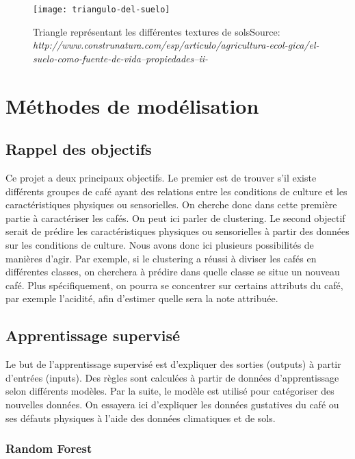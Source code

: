\begin{figure}[H]
	\texttt{[image: triangulo-del-suelo]}
	\caption{\label{TriangleTexture} Triangle représentant les différentes textures de sols\newline Source: \textit{http://www.construnatura.com/esp/articulo/agricultura-ecol-gica/el-suelo-como-fuente-de-vida--propiedades--ii-}}
\end{figure}




\chapter{Méthodes de modélisation}
\section{Rappel des objectifs}\label{obj}
Ce projet a deux principaux objectifs. Le premier est de trouver s'il existe différents groupes de café ayant des relations entre les conditions de culture et les caractéristiques physiques ou sensorielles. On cherche donc dans cette première partie à caractériser les cafés. On peut ici parler de clustering.  Le second objectif serait de prédire les caractéristiques physiques ou sensorielles à partir des données sur les conditions de culture. Nous avons donc ici plusieurs possibilités de manières d'agir. Par exemple, si le clustering a réussi à diviser les cafés en différentes classes, on cherchera à prédire dans quelle classe se situe un nouveau café. Plus spécifiquement, on pourra se concentrer sur certains attributs du café, par exemple l'acidité, afin d'estimer quelle sera la note attribuée. 



\newpage

\section{Apprentissage supervisé}
Le but de l'apprentissage supervisé est d'expliquer des sorties (outputs) à partir d'entrées (inputs). Des règles sont calculées à partir de données d'apprentissage selon différents modèles. Par la suite, le modèle est utilisé pour catégoriser des nouvelles données. On essayera ici d'expliquer les données gustatives du café ou ses défauts physiques à l'aide des données climatiques et de sols. 


\subsection{Random Forest}


